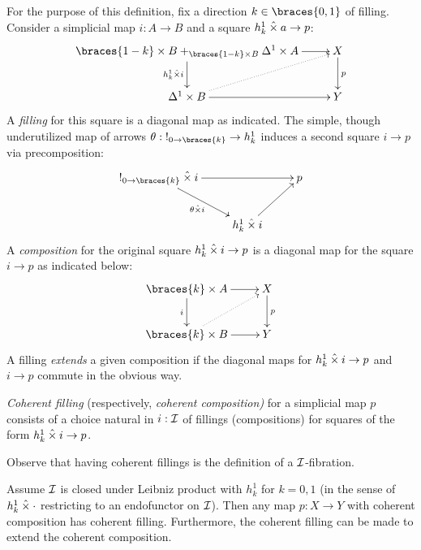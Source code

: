 \documentclass[reqno,10pt,a4paper,oneside]{amsart}
\begin{document}
\begin{definition}
For the purpose of this definition, fix a direction $k \in \braces{0, 1}$ of filling.
Consider a simplicial map $i : A \to B$ and a square $h_k^1 \hattimes a \to p$:
\[
\xymatrix{
  \braces{1-k} \times B +_{\braces{1-k} \times B} \Delta^1 \times A
  \ar[r]
  \ar[d]_{h_k^1 \hattimes i}
&
  X
  \ar[d]^{p}
\\
  \Delta^1 \times B
  \ar[r]
  \ar@{.>}[ur]
&
  Y
}
\]
A \emph{filling} for this square is a diagonal map as indicated.
The simple, though underutilized map of arrows $\theta : \canonical_{0 \to \braces{k}} \to h_k^1$ induces a second square $i \to p$ via precomposition:
\[
\xymatrix{
  \canonical_{0 \to \braces{k}} \hattimes i
  \ar[rr]
  \ar[dr]_{\theta \hattimes i}
&&
  p
\\&
  h_k^1 \hattimes i
  \ar[ur]
}
\]
A \emph{composition} for the original square $h_k^1 \hattimes i \to p$ is a diagonal map for the square $i \to p$ as indicated below:
\[
\xymatrix{
  \braces{k} \times A
  \ar[r]
  \ar[d]_{i}
&
  X
  \ar[d]^{p}
\\
  \braces{k} \times B
  \ar[r]
  \ar@{.>}[ur]
&
  Y
}
\]
A filling \emph{extends} a given composition if the diagonal maps for $h_k^1 \hattimes i \to p$ and $i \to p$ commute in the obvious way.
\end{definition}

\begin{definition}
\emph{Coherent filling} (respectively, \emph{coherent composition)} for a simplicial map $p$ consists of a choice natural in $i : \cal{I}$ of fillings (compositions) for squares of the form $h_k^1 \hattimes i \to p$.
\end{definition}

Observe that having coherent fillings is the definition of a $\cal{I}$-fibration.

\begin{lemma}
Assume $\cal{I}$ is closed under Leibniz product with $h_k^1$ for $k = 0, 1$ (in the sense of $h_k^1 \hattimes \arghole$ restricting to an endofunctor on $\cal{I}$).
Then any map $p : X \to Y$ with coherent composition has coherent filling.
Furthermore, the coherent filling can be made to extend the coherent composition.
\end{lemma}
\end{document}
